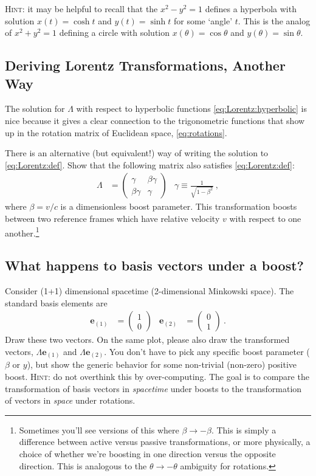 \documentclass[12pt]{article}
\numberwithin{equation}{section}    %
\renewcommand{\vec}[1]{\mathbf{#1}} %
\begin{document}
\textsc{Hint:} it may be helpful to recall that the $x^2 - y^2 = 1$ defines a hyperbola with solution $x(t) = \cosh t$ and $y(t) = \sinh t$ for some `angle' $t$. This is the analog of $x^2 + y^2 = 1$ defining a circle with solution $x(\theta) = \cos\theta$ and $y(\theta) = \sin\theta$.


\subsection{Deriving Lorentz Transformations, Another Way}

The solution for $\Lambda$ with respect to hyperbolic functions \eqref{eq:Lorentz:hyperbolic} is nice because it gives a clear connection to the trigonometric functions that show up in the rotation matrix of Euclidean space, \eqref{eq:rotations}.

There is an alternative (but equivalent!) way of writing the solution to \eqref{eq:Lorentz:def}. Show that the following matrix also satisfies \eqref{eq:Lorentz:def}:
\begin{align}
	\Lambda &=
	\begin{pmatrix}
		\gamma & \beta\gamma\\
		\beta\gamma & \gamma
	\end{pmatrix}
	&
	\gamma \equiv \frac{1}{\sqrt{1-\beta^2}} \ ,
	\label{eq:gamma:beta}
\end{align} 
where $\beta=v/c$ is a dimensionless boost parameter. This transformation boosts between two reference frames which have relative velocity $v$ with respect to one another.\footnote{Sometimes you'll see versions of this where $\beta\to -\beta$. This is simply a difference between active versus passive transformations, or more physically, a choice of whether we're boosting in one direction versus the opposite direction. This is analogous to the $\theta \to -\theta$ ambiguity for rotations.}


\subsection{What happens to basis vectors under a boost?}

Consider (1+1) dimensional spacetime (2-dimensional Minkowski space). The standard basis elements are 
\begin{align}
	\vec{e}_{(1)} &=
	\begin{pmatrix}
		1\\0
	\end{pmatrix}
	&
	\vec{e}_{(2)} &=
	\begin{pmatrix}
		0\\1
	\end{pmatrix} \ .
\end{align}
Draw these two vectors. On the same plot, please also draw the transformed vectors, $\Lambda\vec{e}_{(1)}$ and $\Lambda\vec{e}_{(2)}$. You don't have to pick any specific boost parameter ($\beta$ or $y$), but show the generic behavior for some non-trivial (non-zero) positive boost. \textsc{Hint}: do not overthink this by over-computing. The goal is to compare the transformation of basis vectors in \emph{spacetime} under boosts to the transformation of vectors in \emph{space} under rotations.
\end{document}
